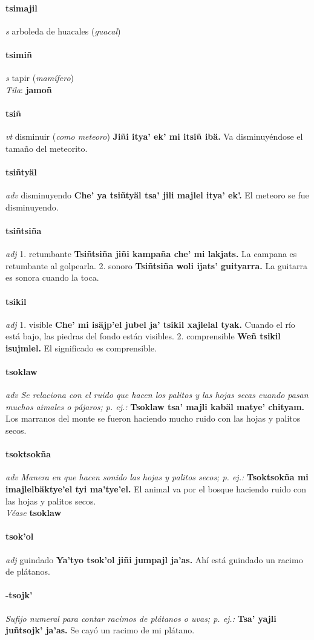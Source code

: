 \documentclass{scrbook}
\newcommand{\entry}[1]{\paragraph{#1}}
\newcommand{\onedefinition}[1]{#1.}
\newcommand{\nontranslationdef}[1]{\textit{#1}}
\newcommand{\partofspeech}[1]{\textit{#1}}
\newcommand{\spanishtranslation}[1]{#1}
\newcommand{\clarification}[1]{(\textit{#1})}
\newcommand{\cholexample}[1]{\textbf{#1}}
\newcommand{\exampletranslation}[1]{#1}
\newcommand{\dialectvariant}[1]{\\\textit{#1}:}
\newcommand{\dialectword}[1]{\textbf{#1}}
\newcommand{\alsosee}[1]{\\\textit{Véase} \textbf{#1}}
\begin{document}
\begin{multicols}{2}
\entry{tsimajil}
\partofspeech{s}
\spanishtranslation{arboleda de huacales}
\clarification{guacal}

\entry{tsimiñ}
\partofspeech{s}
\spanishtranslation{tapir}
\clarification{mamífero}
\dialectvariant{Tila}
\dialectword{jamoñ}

\entry{tsiñ}
\partofspeech{vt}
\spanishtranslation{disminuir}
\clarification{como meteoro}
\cholexample{Jiñi itya' ek' mi itsiñ ibä.}
\exampletranslation{Va disminuyéndose el tamaño del meteorito.}

\entry{tsiñtyäl}
\partofspeech{adv}
\spanishtranslation{disminuyendo}
\cholexample{Che' ya tsiñtyäl tsa' jili majlel itya' ek'.}
\exampletranslation{El meteoro se fue disminuyendo.}

\entry{tsiñtsiña}
\partofspeech{adj}
\onedefinition{1}
\spanishtranslation{retumbante}
\cholexample{Tsiñtsiña jiñi kampaña che' mi lakjats.}
\exampletranslation{La campana es retumbante al golpearla.}
\onedefinition{2}
\spanishtranslation{sonoro}
\cholexample{Tsiñtsiña woli ijats' guityarra.}
\exampletranslation{La guitarra es sonora cuando la toca.}

\entry{tsikil}
\partofspeech{adj}
\onedefinition{1}
\spanishtranslation{visible}
\cholexample{Che' mi isäjp'el jubel ja' tsikil xajlelal tyak.}
\exampletranslation{Cuando el río está bajo, las piedras del fondo están visibles.}
\onedefinition{2}
\spanishtranslation{comprensible}
\cholexample{Weñ tsikil isujmlel.}
\exampletranslation{El significado es comprensible.}

\entry{tsoklaw}
\partofspeech{adv}
\nontranslationdef{Se relaciona con el ruido que hacen los palitos y las hojas secas cuando pasan muchos aimales o pájaros; p. ej.:}
\cholexample{Tsoklaw tsa' majli kabäl matye' chityam.}
\exampletranslation{Los marranos del monte se fueron haciendo mucho ruido con las hojas y palitos secos.}

\entry{tsoktsokña}
\partofspeech{adv}
\nontranslationdef{Manera en que hacen sonido las hojas y palitos secos; p. ej.:}
\cholexample{Tsoktsokña mi imajlelbäktye'el tyi ma'tye'el.}
\exampletranslation{El animal va por el bosque haciendo ruido con las hojas y palitos secos.}
\alsosee{tsoklaw}

\entry{tsok'ol}
\partofspeech{adj}
\spanishtranslation{guindado}
\cholexample{Ya'tyo tsok'ol jiñi jumpajl ja'as.}
\exampletranslation{Ahí está guindado un racimo de plátanos.}

\entry{-tsojk'}
\nontranslationdef{Sufijo numeral para contar racimos de plátanos o uvas; p. ej.:}
\cholexample{Tsa' yajli juñtsojk' ja'as.}
\exampletranslation{Se cayó un racimo de mi plátano.}


\end{multicols}
\end{document}
